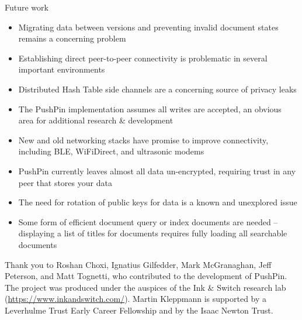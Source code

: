 \documentclass[sigplan,10pt]{acmart}
\begin{document}
Future work
\begin{itemize}
    \item Migrating data between versions and preventing invalid document states remains a concerning problem
    \item Establishing direct peer-to-peer connectivity is problematic in several important environments
    \item Distributed Hash Table side channels are a concerning source of privacy leaks
    \item The PushPin implementation assumes all writes are accepted, an obvious area for additional research & development
    \item New and old networking stacks have promise to improve connectivity, including BLE, WiFiDirect, and ultrasonic modems
    \item PushPin currently leaves almost all data un-encrypted, requiring trust in any peer that stores your data
    \item The need for rotation of public keys for data is a known and unexplored issue
    \item Some form of efficient document query or index documents are needed -- displaying a list of titles for documents requires fully loading all searchable documents
\end{itemize}

\begin{acks}
Thank you to Roshan Choxi, Ignatius Gilfedder, Mark McGranaghan, Jeff Peterson, and Matt Tognetti, who contributed to the development of PushPin.
The project was produced under the auspices of the Ink \& Switch research lab (\url{https://www.inkandswitch.com/}).
Martin Kleppmann is supported by a Leverhulme Trust Early Career Fellowship and by the Isaac Newton Trust.
\end{acks}


{}
\end{document}
